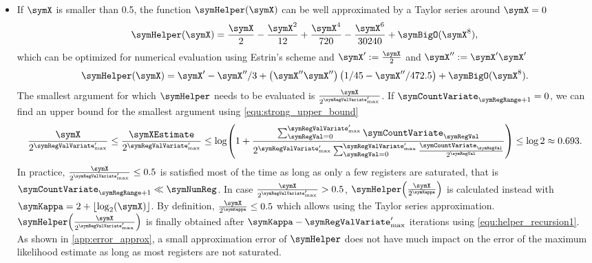 \documentclass[a4paper]{scrartcl}
\begin{document}
\begin{itemize}
\item If $\symX$ is smaller than 0.5, the function $\symHelper(\symX)$ can be well approximated by a Taylor series around $\symX=0$
\begin{equation}
\symHelper(\symX)
=
\frac{\symX}{2} - \frac{\symX^2}{12} +\frac{\symX^4}{720}-\frac{\symX^6}{30240} + \symBigO(\symX^{8}),
\end{equation}
which can be optimized for numerical evaluation using Estrin's scheme and $\symX' := \frac{\symX}{2}$ and $\symX'' := \symX' \symX'$
\begin{equation}
\label{equ:taylor}
\symHelper(\symX)
=
\symX' - \symX''/3 + \left(\symX'' \symX''\right)\left(1/45-\symX''/472.5\right)
+ \symBigO(\symX^{8}).
\end{equation}
The smallest argument for which $\symHelper$ needs to be evaluated is $\frac{\symX}{2^{\symRegValVariate'_\text{max}}}$. If 
$\symCountVariate_{\symRegRange+1}=0$, we can find an upper bound for the smallest argument using \eqref{equ:strong_upper_bound}
\begin{equation}
\frac{\symX}{2^{\symRegValVariate'_\text{max}}} 
\leq
\frac{\symXEstimate}{2^{\symRegValVariate'_\text{max}}} 
\leq
\log\!\left(
1+
\frac{\sum_{\symRegVal=0}^{\symRegValVariate'_\text{max}}\symCountVariate_\symRegVal}
{
2^{\symRegValVariate'_\text{max}}
\sum_{\symRegVal=0}^{\symRegValVariate'_\text{max}}
\frac{\symCountVariate_\symRegVal}{2^\symRegVal}
}
\right)
\leq \log 2 \approx 0.693.
\end{equation}
In practice, $\frac{\symX}{2^{\symRegValVariate'_\text{max}}}\leq0.5$ is satisfied most of the time as long as only a few registers are saturated, that is $\symCountVariate_{\symRegRange+1}\ll \symNumReg$. In case $\frac{\symX}{2^{\symRegValVariate'_\text{max}}} > 0.5$, $\symHelper\!\left(\frac{\symX}{2^{\symKappa}}\right)$ is calculated instead with $\symKappa = 2+\lfloor\log_2(\symX)\rfloor$. By definition, $\frac{\symX}{2^{\symKappa}}\leq 0.5$ which allows using the Taylor series approximation. $\symHelper\!\left(\frac{\symX}{2^{\symRegValVariate'_\text{max}}}\right)$ is finally obtained after $\symKappa -\symRegValVariate'_\text{max}$ iterations using \eqref{equ:helper_recursion1}. As shown in \cref{app:error_approx}, a small approximation error of $\symHelper$ does not have much impact on the error of the maximum likelihood estimate as long as most registers are not saturated.
\end{itemize}
\end{document}
